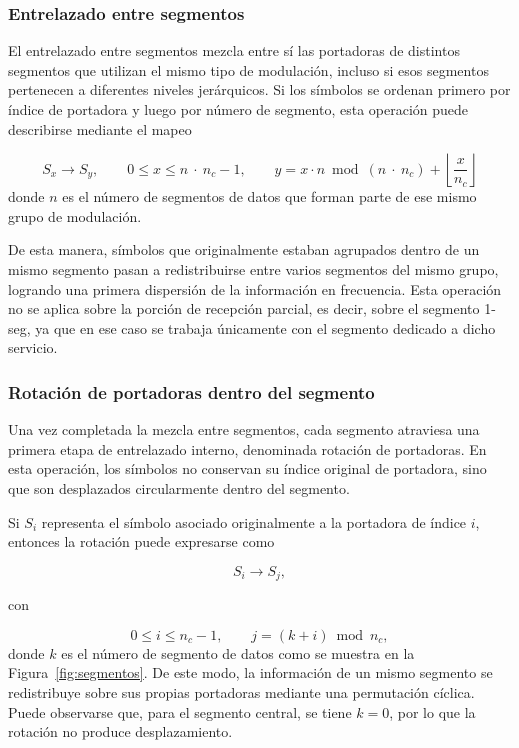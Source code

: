 \subsubsection{Entrelazado entre segmentos}

El entrelazado entre segmentos mezcla entre sí las portadoras de distintos segmentos que utilizan el mismo tipo de modulación, incluso si esos segmentos pertenecen a diferentes niveles jerárquicos. Si los símbolos se ordenan primero por índice de portadora y luego por número de segmento, esta operación puede describirse mediante el mapeo

\begin{equation}
S_x \rightarrow S_y,
\qquad
0 \leq x \leq n\ \cdot \ n_c - 1,
\qquad
y = x \cdot n \bmod (n\ \cdot \ n_c) + \left\lfloor \frac{x}{n_c} \right\rfloor
\label{eq:entrelazado_segmentos}
\end{equation}
donde \(n\) es el número de segmentos de datos que forman parte de ese mismo grupo de modulación.

De esta manera, símbolos que originalmente estaban agrupados dentro de un mismo segmento pasan a redistribuirse entre varios segmentos del mismo grupo, logrando una primera dispersión de la información en frecuencia. Esta operación no se aplica sobre la porción de recepción parcial, es decir, sobre el segmento 1-seg, ya que en ese caso se trabaja únicamente con el segmento dedicado a dicho servicio.

\subsubsection{Rotación de portadoras dentro del segmento}

Una vez completada la mezcla entre segmentos, cada segmento atraviesa una primera etapa de entrelazado interno, denominada rotación de portadoras. En esta operación, los símbolos no conservan su índice original de portadora, sino que son desplazados circularmente dentro del segmento.

Si $S_i$ representa el símbolo asociado originalmente a la portadora de índice $i$, entonces la rotación puede expresarse como

\begin{equation}
\label{eq:rotacion_segmento}
S_i \rightarrow S_j,
\end{equation}

con

\begin{equation}
0 \leq i \leq n_c - 1,
\qquad
j = (k + i) \bmod n_c,
\label{eq:rotacion_segmento_j}
\end{equation}
donde $k$ es el número de segmento de datos  como se muestra en la Figura~\ref{fig:segmentos}. De este modo, la información de un mismo segmento se redistribuye sobre sus propias portadoras mediante una permutación cíclica. Puede observarse que, para el segmento central, se tiene $k=0$, por lo que la rotación no produce desplazamiento.

